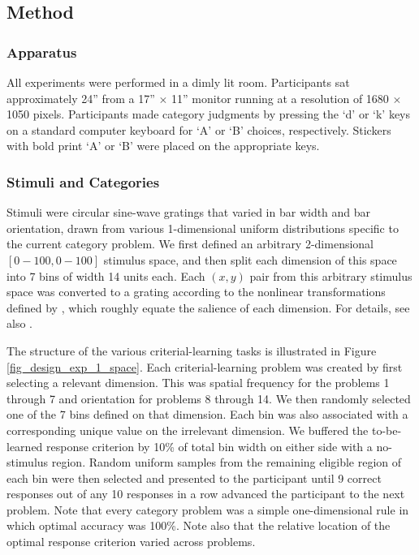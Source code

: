 \documentclass[doc, floatsintext]{apa7}
\begin{document}
\subsection{Method}

\subsubsection{Apparatus}
All experiments were performed in a dimly lit room.
Participants sat approximately 24'' from a 17'' $\times$
11'' monitor running at a resolution of 1680 $\times$ 1050
pixels. Participants made category judgments by pressing the
`d' or `k' keys on a standard computer keyboard for `A' or
`B' choices, respectively. Stickers with bold print `A' or
`B' were placed on the appropriate keys.

\subsubsection{Stimuli and Categories}
Stimuli were circular sine-wave gratings that varied in bar
width and bar orientation, drawn from various 1-dimensional
uniform distributions specific to the current category
problem. We first defined an arbitrary 2-dimensional
$[0-100,0-100]$ stimulus space, and then split each
dimension of this space into 7 bins of width 14 units each.
Each $(x,y)$ pair from this arbitrary stimulus space was
converted to a grating according to the nonlinear
transformations defined by
\textcite{treutwein1989perceptual}, which roughly equate the
salience of each dimension. For details, see also
\textcite{CrossleyAshby2015}.

The structure of the various criterial-learning tasks is
illustrated in Figure \ref{fig_design_exp_1_space}. Each
criterial-learning problem was created by first selecting a
relevant dimension. This was spatial frequency for the
problems 1 through 7 and orientation for problems 8 through
14. We then randomly selected one of the 7 bins defined on
that dimension. Each bin was also associated with a
corresponding unique value on the irrelevant dimension. We
buffered the to-be-learned response criterion by 10\% of
total bin width on either side with a no-stimulus region.
Random uniform samples from the remaining eligible region of
each bin were then selected and presented to the participant
until 9 correct responses out of any 10 responses in a row
advanced the participant to the next problem. Note that
every category problem was a simple one-dimensional rule in
which optimal accuracy was 100\%.  Note also that the
relative location of the optimal response criterion varied
across problems.
\end{document}
